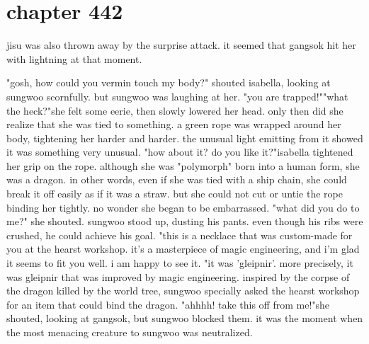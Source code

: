 \section{chapter 442}

jisu was also thrown away by the surprise attack.
 it seemed that gangsok hit her with lightning at that moment.





"gosh, how could you vermin touch my body?" shouted isabella, looking at sungwoo scornfully.
 but sungwoo was laughing at her.
"you are trapped!""what the heck?"she felt some eerie, then slowly lowered her head.
 only then did she realize that she was tied to something.
 a green rope was wrapped around her body, tightening her harder and harder.
the unusual light emitting from it showed it was something very unusual.
"how about it? do you like it?"isabella tightened her grip on the rope.
 although she was "polymorph" born into a human form, she was a dragon.
 in other words, even if she was tied with a ship chain, she could break it off easily as if it was a straw.
but she could not cut or untie the rope binding her tightly.
 no wonder she began to be embarrassed.
"what did you do to me?" she shouted.
sungwoo stood up, dusting his pants.
 even though his ribs were crushed, he could achieve his goal.
 "this is a necklace that was custom-made for you at the hearst workshop.
 it's a masterpiece of magic engineering, and i'm glad it seems to fit you well.
 i am happy to see it.
"it was 'gleipnir'.
 more precisely, it was gleipnir that was improved by magic engineering.
inspired by the corpse of the dragon killed by the world tree, sungwoo specially asked the hearst workshop for an item that could bind the dragon.
"ahhhh! take this off from me!"she shouted, looking at gangsok, but sungwoo blocked them.
 it was the moment when the most menacing creature to sungwoo was neutralized.
 
